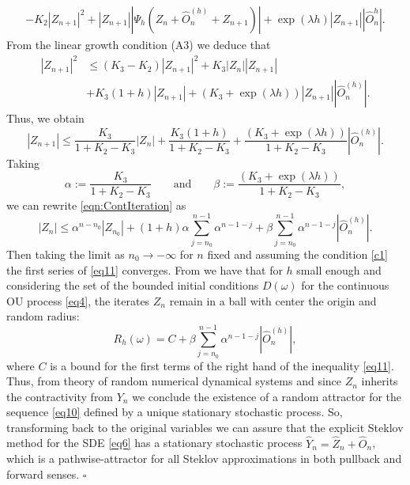 \begin{Proof}
\begin{enumerate}
\begin{align*}
	    -K_2|Z_{n+1}|^2
	    +
	    \left|
	      Z_{n+1}
	    \right|
	    \left|
	      \Psi_h(Z_n+\widehat{O}_n^{(h)}+Z_{n+1})
	    \right|
	    +
	    \exp{(\lambda h)}
	    \left|
	      Z_{n+1}
	    \right|
	    \left|
	      \widehat{O}^{h}_n
	    \right|.
	\end{align*}
	From the linear growth condition (A3) we deduce that
	\begin{align*}
	  |Z_{n+1}|^2
	    &\leq
	    (K_3-K_2)|Z_{n+1}|^2
	    +
	    K_3|Z_n||Z_{n+1}|\\
	    &+
	    K_3(1+h)|Z_{n+1}|
	    +
	    (K_3+\exp(\lambda h))
	    |Z_{n+1}||\widehat{O}_n^{(h)}|.
	\end{align*}
	Thus, we obtain
	\begin{equation}\label{eqn:ContIteration}
	  |Z_{n+1}|
	  \leq
	    \frac{K_3}{1+K_2-K_3}|Z_n|
	    +
	    \frac{K_3(1+h)}{1+K_2-K_3}
	    +
	    \frac{(K_3+\exp(\lambda h))}{1+K_2-K_3}|\widehat{O}_n^{(h)}|.
	\end{equation}
	Taking
	\begin{equation*}
	  \alpha
	    :=\frac{K_3}{1+K_2-K_3} \qquad \mbox{and} \qquad
	    \beta
	    :=
	      \frac{(K_3+\exp(\lambda h))}{1+K_2-K_3},
	\end{equation*}
	we can rewrite \eqref{eqn:ContIteration} as
	\begin{equation} \label{eq11}
	  |Z_n|\leq
	    \alpha^{n-n_0}|Z_{n_0}|
	    +
	    (1+h)\alpha
	    \sum_{j=n_0}^{n-1}
	      \alpha^{n-1-j}
	    + \beta
	    \sum_{j=n_0}^{n-1}
	      \alpha^{n-1-j}
	      |\widehat{O}_n^{(h)}|.
	\end{equation}
	Then taking the limit as $n_0\to -\infty$   for $n$ fixed and assuming the
	condition \eqref{c1}  the first series of \eqref{eq11} converges. From
	\cite{Robinson2002} we have that for $h$ small enough and considering the set of
	the bounded initial conditions $D(\omega)$ for the continuous OU process
	\eqref{eq4}, the iterates $Z_n$ remain  in a ball with center the origin and
	random radius:
	$$
	  R_h(\omega)=C+\beta \sum_{j=n_0}^{n-1}
	  \alpha^{n-1-j}
	  |\widehat{O}_n^{(h)}|,
	$$
	where $C$ is a bound for the first terms of the right hand of the inequality
	\eqref{eq11}. Thus, from theory of random numerical dynamical systems
	\cite{kloeden1999towards} and since $Z_n$ inherits the contractivity from $Y_n$ we
	conclude the existence of a random attractor for the sequence \eqref{eq10}
	defined by a unique stationary stochastic process. So, transforming back to the
	original variables we can assure that the explicit Steklov method for the SDE
	\eqref{eq6} has a stationary stochastic process
	$\widehat{Y}_n=\widehat{Z}_n+\widehat{O}_n$, which is a pathwise-attractor for
	all Steklov approximations in both pullback and forward senses. $\square$
      \end{enumerate}
    \end{Proof}
